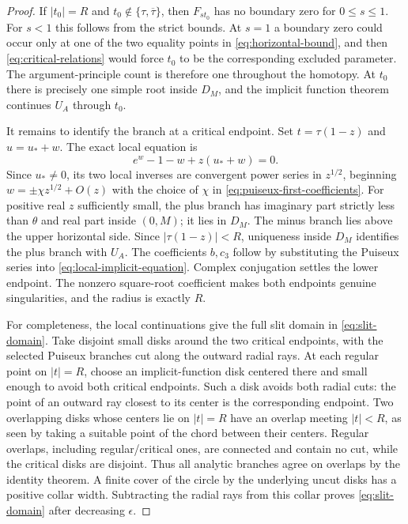\documentclass[11pt]{article}
\numberwithin{equation}{section}
\theoremstyle{definition}
\theoremstyle{remark}
\begin{document}
\begin{proof}
If $|t_0|=R$ and $t_0\notin\{\tau,\overline\tau\}$, then
$F_{s t_0}$ has no boundary zero for $0\leq s\leq1$.  For $s<1$ this
follows from the strict bounds.  At $s=1$ a boundary zero could occur
only at one of the two equality points in \eqref{eq:horizontal-bound},
and then \eqref{eq:critical-relations} would force $t_0$ to be the
corresponding excluded parameter.  The argument-principle count is
therefore one throughout the homotopy.  At $t_0$ there is precisely one
simple root inside $D_M$, and the implicit function theorem continues
$U_A$ through $t_0$.

It remains to identify the branch at a critical endpoint.  Set
$t=\tau(1-z)$ and $u=u_*+w$.  The exact local equation is
\begin{equation}\label{eq:local-implicit-equation}
 e^w-1-w+z(u_*+w)=0.
\end{equation}
Since $u_*\neq0$, its two local inverses are convergent power series
in $z^{1/2}$, beginning $w=\pm\chi z^{1/2}+O(z)$ with the choice
of $\chi$ in \eqref{eq:puiseux-first-coefficients}.  For positive real
$z$ sufficiently small, the plus branch has imaginary part strictly
less than $\theta$ and real part inside $(0,M)$; it lies in $D_M$.
The minus branch lies above the upper horizontal side.  Since
$|\tau(1-z)|<R$, uniqueness inside $D_M$ identifies the plus branch
with $U_A$.  The coefficients $b,c_3$ follow by substituting the
Puiseux series into \eqref{eq:local-implicit-equation}.  Complex
conjugation settles the lower endpoint.  The nonzero square-root
coefficient makes both endpoints genuine singularities, and the
radius is exactly $R$.

For completeness, the local continuations give the full slit domain
in \eqref{eq:slit-domain}.  Take disjoint small disks around the two
critical endpoints, with the selected Puiseux branches cut along the
outward radial rays.  At each regular point on $|t|=R$, choose an
implicit-function disk centered there and small enough to avoid both
critical endpoints.  Such a disk avoids both radial cuts: the point
of an outward ray closest to its center is the corresponding endpoint.
Two overlapping disks whose centers lie on $|t|=R$ have an overlap
meeting $|t|<R$, as seen by taking a suitable point of the chord between
their centers.  Regular overlaps, including regular/critical ones,
are connected and contain no cut, while the critical disks are disjoint.
Thus all analytic branches agree on overlaps by the identity theorem.
A finite cover of the circle by the underlying uncut disks has a
positive collar width.  Subtracting the radial rays from this collar
proves \eqref{eq:slit-domain} after decreasing $\epsilon$.
\end{proof}
\end{document}
